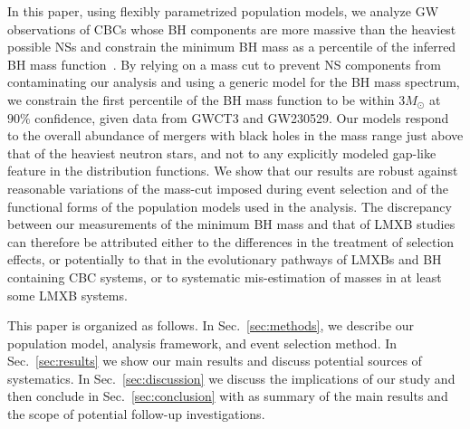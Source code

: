 \documentclass[modern]{aastex631}
\begin{document}
In this paper, using flexibly parametrized population models, we analyze GW
observations of CBCs whose BH components are more massive than the heaviest
possible NSs and constrain the minimum BH mass as a percentile of the inferred
BH mass function~\citep[simmilar to the approach of X-ray binary studies, ][]{Farr:2010tu}.  By relying on a mass cut to prevent NS
components from contaminating our analysis and using a generic model for the BH
mass spectrum, we constrain the first percentile of the BH mass function to be within $3M_{\odot}$ at $90\%$ confidence, given
data from GWCT3 and GW230529. Our models respond to the overall abundance of mergers
with black holes in the mass range just above that of the heaviest neutron
stars, and not to any explicitly modeled gap-like feature in the distribution functions. We show that our results are robust against reasonable variations of
the mass-cut imposed during event selection and of the functional forms of the
population models used in the analysis. The discrepancy
between our measurements of the minimum BH mass and that of LMXB studies can
therefore be attributed either to the differences in the treatment of selection
effects, or potentially to that in the evolutionary pathways of LMXBs and BH
containing CBC systems, or to systematic mis-estimation of
masses in at least some LMXB systems.

This paper is organized as follows. In Sec.~\ref{sec:methods}, we describe our population model, analysis framework, and event selection method. In Sec.~\ref{sec:results} we show our main results and discuss potential sources of systematics. In Sec.~\ref{sec:discussion} we discuss the implications of our study and then conclude in Sec.~\ref{sec:conclusion} with as summary of the main results and the scope of potential follow-up investigations.
\end{document}
